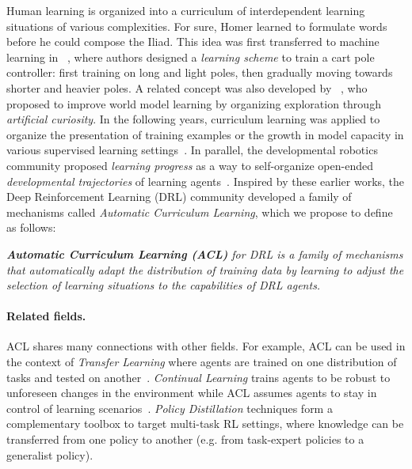\documentclass{article}
\newcommand{\mycite}[1]{\citeauthor{#1}~\shortcite{#1}}
\begin{document}
Human learning is organized into a curriculum of interdependent learning situations of various complexities. For sure, Homer learned to formulate words before he could compose the Iliad. This idea was first transferred to machine learning in \mycite{selfridge}, where authors designed a \textit{learning scheme} to train a cart pole controller: first training on long and light poles, then gradually moving towards shorter and heavier poles. A related concept was also developed by \mycite{Schmid}, who proposed to improve world model learning by organizing exploration through \textit{artificial curiosity}.
%
In the following years, curriculum learning was applied to organize the presentation of training examples or the growth in model capacity in various supervised learning settings~\cite{elman,krueger,bengiocl}.
%
In parallel, the developmental robotics community proposed \textit{learning progress} as a way to self-organize open-ended \textit{developmental trajectories} of learning agents~\cite{oudeyer2007intrinsic}. Inspired by these earlier works, the Deep Reinforcement Learning (DRL) community developed a family of mechanisms called \textit{Automatic Curriculum Learning}, which we propose to define as follows:

\textit{\textbf{Automatic Curriculum Learning (ACL)} for DRL is a family of mechanisms that automatically adapt the distribution of training data by learning to adjust the selection of learning situations to the capabilities of DRL agents.}

\paragraph{Related fields.}ACL shares many connections with other fields. For example, ACL can be used in the context of \textit{Transfer Learning} where agents are trained on one distribution of tasks and tested on another~\cite{taylortransfer}. \textit{Continual Learning} trains agents to be robust to unforeseen changes in the environment while ACL assumes agents to stay in control of learning scenarios~\cite{continual-learning-review}. \textit{Policy Distillation} techniques \cite{pol-dil-review} form a complementary toolbox to target multi-task RL settings, where knowledge can be transferred from one policy to another (e.g. from task-expert policies to a generalist policy).
\end{document}
